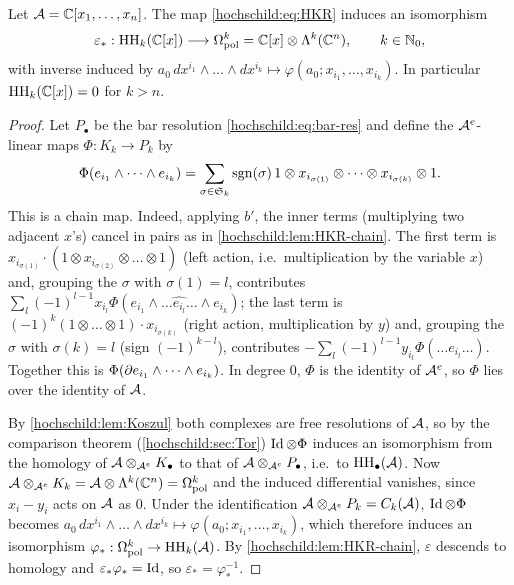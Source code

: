 \begin{theorem}\label{hochschild:thm:polynomial}
Let $\mathcal{A}=\mathbb{C}[x_1,\dots,x_n]$. The map \eqref{hochschild:eq:HKR} induces an isomorphism
\begin{equation*}
  \varepsilon_*:\operatorname{HH}_k(\mathbb{C}[x])\longrightarrow\Omega^k_{\mathrm{pol}}
  =\mathbb{C}[x]\otimes\Lambda^k(\mathbb{C}^n),\qquad k\in\mathbb{N}_0,
\end{equation*}
with inverse induced by $a_0\,dx^{i_1}\wedge\dots\wedge dx^{i_k}\longmapsto
\varphi(a_0;x_{i_1},\dots,x_{i_k})$. In particular $\operatorname{HH}_k(\mathbb{C}[x])=0$ for
$k>n$.
\end{theorem}
\begin{proof}
Let $P_\bullet$ be the bar resolution \eqref{hochschild:eq:bar-res} and define
the $\mathcal{A}^e$-linear maps $\Phi:K_k\to P_k$ by
\begin{equation*}
  \Phi(e_{i_1}\wedge\dots\wedge e_{i_k})=\sum_{\sigma\in\mathfrak S_k}\operatorname{sgn}(\sigma)\,
  1\otimes x_{i_{\sigma(1)}}\otimes\dots\otimes x_{i_{\sigma(k)}}\otimes1 .
\end{equation*}
This is a chain map. Indeed, applying $b'$, the inner terms (multiplying two
adjacent $x$'s) cancel in pairs as in \cref{hochschild:lem:HKR-chain}. The
first term is $x_{i_{\sigma(1)}}\cdot(1\otimes x_{i_{\sigma(2)}}\otimes\dots\otimes1)$
(left action, i.e.\ multiplication by the variable $x$) and, grouping the
$\sigma$ with $\sigma(1)=l$, contributes
$\sum_l(-1)^{l-1}x_{i_l}\Phi(e_{i_1}\wedge\dots\widehat{e_{i_l}}\dots\wedge e_{i_k})$;
the last term is $(-1)^k(1\otimes\dots\otimes1)\cdot x_{i_{\sigma(k)}}$
(right action, multiplication by $y$) and, grouping the $\sigma$ with
$\sigma(k)=l$ (sign $(-1)^{k-l}$), contributes
$-\sum_l(-1)^{l-1}y_{i_l}\Phi(\dots\widehat{e_{i_l}}\dots)$. Together this is
$\Phi(\partial e_{i_1}\wedge\dots\wedge e_{i_k})$. In degree $0$, $\Phi$ is the
identity of $\mathcal{A}^e$, so $\Phi$ lies over the identity of $\mathcal{A}$.

By \cref{hochschild:lem:Koszul} both complexes are free resolutions of $\mathcal{A}$,
so by the comparison theorem (\cref{hochschild:sec:Tor}) $\operatorname{Id}\otimes\Phi$
induces an isomorphism from the homology of $\mathcal{A}\otimes_{\mathcal{A}^e}K_\bullet$ to
that of $\mathcal{A}\otimes_{\mathcal{A}^e}P_\bullet$, i.e.\ to $\operatorname{HH}_\bullet(\mathcal{A})$. Now
$\mathcal{A}\otimes_{\mathcal{A}^e}K_k=\mathcal{A}\otimes\Lambda^k(\mathbb{C}^n)=\Omega^k_{\mathrm{pol}}$ and
the induced differential vanishes, since $x_i-y_i$ acts on $\mathcal{A}$ as $0$. Under
the identification $\mathcal{A}\otimes_{\mathcal{A}^e}P_k=C_k(\mathcal{A})$, $\operatorname{Id}\otimes\Phi$ becomes
$a_0\,dx^{i_1}\wedge\dots\wedge dx^{i_k}\mapsto\varphi(a_0;x_{i_1},\dots,x_{i_k})$,
which therefore induces an isomorphism $\varphi_*:\Omega^k_{\mathrm{pol}}\to\operatorname{HH}_k(\mathcal{A})$.
By \cref{hochschild:lem:HKR-chain}, $\varepsilon$ descends to homology and
$\varepsilon_*\varphi_*=\operatorname{Id}$, so $\varepsilon_*=\varphi_*^{-1}$.
\end{proof}

